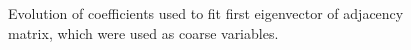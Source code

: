 \documentclass[11pt]{article}
\begin{document}
\begin{figure}[h!]
{    \label{fig:er4Coef}
  }
  \hspace{3mm}
  \caption{Evolution of coefficients used to fit first eigenvector of adjacency matrix, which were used as coarse variables.}
  \label{fig:erCoeff}
\end{figure}

\end{document}
